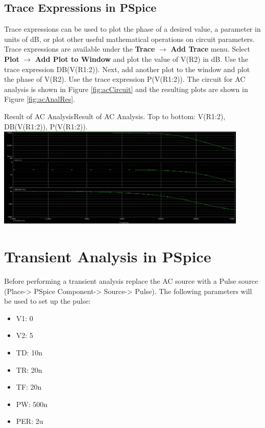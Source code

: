 \documentclass[12pt]{../manual}
\begin{document}
\subsection*{Trace Expressions in PSpice}
Trace expressions can be used to plot the phase of a desired value, a parameter in units of dB, or plot other useful mathematical operations on circuit parameters. Trace expressions are available under the \textbf{Trace} $\to$ \textbf{Add Trace} menu. Select \textbf{Plot} $\to$ \textbf{Add Plot to Window} and plot the value of V(R2) in dB. Use the trace expression DB(V(R1:2)). Next, add another plot to the window and plot the phase of V(R2). Use the trace expression P(V(R1:2)). The circuit for AC analysis is shown in Figure \ref{fig:acCircuit} and the resulting plots are shown in Figure \ref{fig:acAnalRes}.

\begin{myfigure}[label=fig:acAnalRes]{Result of AC Analysis}{Result of AC Analysis. Top to bottom: V(R1:2), DB(V(R1:2)), P(V(R1:2)).}
\centering
\includegraphics[width=0.9\textwidth]{figures/ResultACAnalysisCrop.PNG}
\end{myfigure}
%
\newpage
\section{Transient Analysis in PSpice}

Before performing a transient analysis replace the AC source with a Pulse source (Place-> PSpice Component-> Source-> Pulse). The following parameters will be used to set up the pulse:
\begin{itemize}
\item V1: 0
\item V2: 5
\item TD: 10n
\item TR: 20n
\item TF: 20n
\item PW: 500n
\item PER: 2u
\end{itemize}
\end{document}

